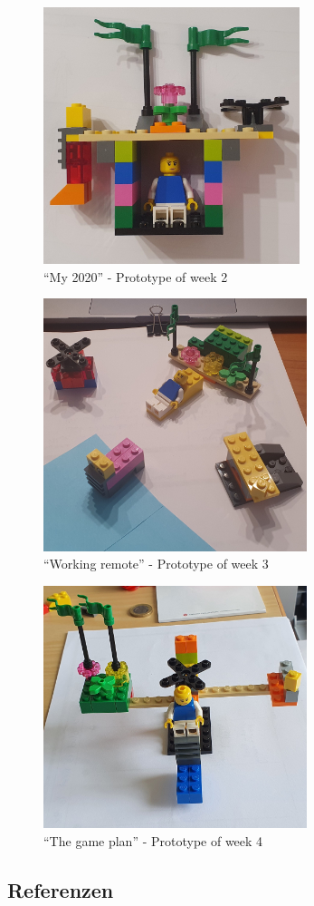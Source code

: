 \begin{figure}[h]
    \begin{center}
        \includegraphics[width=7.5cm]{img/week_2.jpg}
    \end{center}
    \caption{``My 2020'' - Prototype of week 2}
    \label{fig:week2}
\end{figure} 
\begin{center}
    \begin{figure}[h]
        \begin{center}
            \includegraphics[width=7.7cm]{img/week_3_1.jpg}
        \end{center}
        \caption{``Working remote'' - Prototype of week 3}
        \label{fig:week3}
    \end{figure} 
    \begin{figure}[h]
        \begin{center}
            \includegraphics[width=7.7cm]{img/week_4.jpg}
        \end{center}
        \caption{``The game plan'' - Prototype of week 4}
        \label{fig:week4}
    \end{figure} 
\end{center}


\pagebreak
\subsection{Referenzen}
